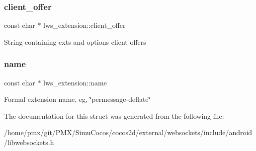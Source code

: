 \subsubsection{\texorpdfstring{client\+\_\+offer}{client\_offer}}
{\footnotesize\ttfamily const char $\ast$ lws\+\_\+extension\+::client\+\_\+offer}

String containing exts and options client offers \mbox{\label{structlws__extension_a5496d751f2e4d9507e78462aa20f6c03}} 
\subsubsection{\texorpdfstring{name}{name}}
{\footnotesize\ttfamily const char $\ast$ lws\+\_\+extension\+::name}

Formal extension name, eg, \char`\"{}permessage-\/deflate\char`\"{} 

The documentation for this struct was generated from the following file\+:\begin{DoxyCompactItemize}
\item 
/home/pmx/git/\+P\+M\+X/\+Simu\+Cocos/cocos2d/external/websockets/include/android/libwebsockets.\+h\end{DoxyCompactItemize}
